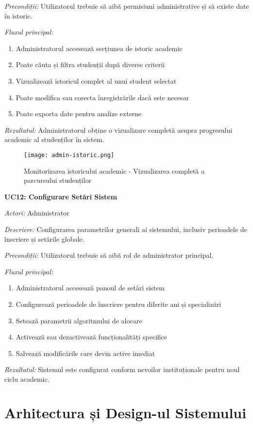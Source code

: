 \documentclass[12pt,a4paper]{report}
\begin{document}
\textit{Precondiții:} Utilizatorul trebuie să aibă permisiuni administrative și să existe date în istoric.

\textit{Fluxul principal:}
\begin{enumerate}
\item Administratorul accesează secțiunea de istoric academic
\item Poate căuta și filtra studenții după diverse criterii
\item Vizualizează istoricul complet al unui student selectat
\item Poate modifica sau corecta înregistrările dacă este necesar
\item Poate exporta date pentru analize externe
\end{enumerate}

\textit{Rezultatul:} Administratorul obține o vizualizare completă asupra progresului academic al studenților în sistem.

\begin{figure}[H]
\centering
\texttt{[image: admin-istoric.png]}
\caption{Monitorizarea istoricului academic - Vizualizarea completă a parcursului studenților}
\label{fig:admin-istoric}
\end{figure}

\textbf{UC12: Configurare Setări Sistem}

\textit{Actori:} Administrator

\textit{Descriere:} Configurarea parametrilor generali ai sistemului, inclusiv perioadele de înscriere și setările globale.

\textit{Precondiții:} Utilizatorul trebuie să aibă rol de administrator principal.

\textit{Fluxul principal:}
\begin{enumerate}
\item Administratorul accesează panoul de setări sistem
\item Configurează perioadele de înscriere pentru diferite ani și specializări
\item Setează parametrii algoritmului de alocare
\item Activează sau dezactivează funcționalități specifice
\item Salvează modificările care devin active imediat
\end{enumerate}

\textit{Rezultatul:} Sistemul este configurat conform nevoilor instituționale pentru noul ciclu academic.

\chapter{Arhitectura și Design-ul Sistemului}
\end{document}
